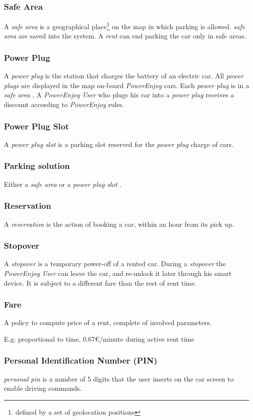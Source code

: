 \documentclass[english]{article}
\newcommand{\rent}{\textit{rent }}
\newcommand{\powerenjoy}{\textit{PowerEnjoy }}
\newcommand{\powerenjoyuser}{\textit{PowerEnjoy User }}
\newcommand{\safearea}{\textit{safe area }}
\newcommand{\powerplug}{\textit{power plug }}
\newcommand{\powerplugs}{\textit{power plugs }}
\newcommand{\resevation}{\textit{reservation }}
\newcommand{\stopover}{\textit{stopover }}
\newcommand{\personalpin}{\textit{personal pin }}
\newcommand{\powerplugslot}{\textit{power plug slot }}
\begin{document}
		\subsubsection {Safe Area}
			A \safearea is a  geographical place\footnote{defined by a set of geolocation positions} on the map in which parking is allowed. \safearea are saved into the system. A \rent can end parking the car only in safe areas.
	\subsubsection{Power Plug}
		A \powerplug is the station that charges the battery of an electric car. All \powerplugs are displayed in the map on-board \powerenjoy cars. Each \powerplug is in a \safearea. A \powerenjoyuser who plugs his car into a \powerplug receives a discount according to \powerenjoy rules.
	\subsubsection{Power Plug Slot}
		A \powerplugslot is a parking slot reserved for the \powerplug charge of cars.
	\subsubsection{Parking solution}
		Either a \safearea or a \powerplugslot.
	\subsubsection{Reservation}
		A \resevation is the action of booking a car, within an hour from its pick up.
	\subsubsection{Stopover}
		A \stopover is a temporary power-off of a rented car. During a \stopover the \powerenjoyuser can leave the car,  and re-unlock it later through his smart device. It is subject to a different fare than the rest of rent time.
	\subsubsection{Fare}
		A policy to compute price of a rent, complete of involved parameters. \par E.g: proportional to time, 0.67\euro/minute during active rent time 
	\subsubsection{Personal Identification Number (PIN)}
		 \personalpin is a number of 5 digits that the user inserts on the car screen to enable driving commands.
\end{document}
